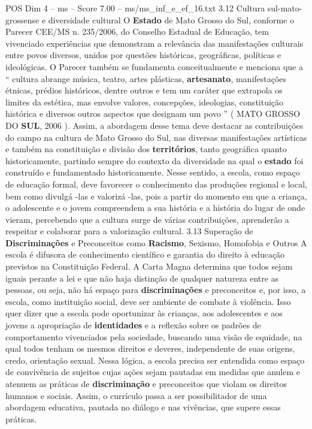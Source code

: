 \begin{textsample}{POS Dim 4 – ms – Score 7.00 – ms/ms\_inf\_e\_ef\_16.txt}  \label{ex:f4_pos_158}
3.12 Cultura sul-mato-grossense e diversidade cultural O \textbf{Estado} de Mato Grosso do Sul, conforme o Parecer CEE/MS n. 235/2006, do Conselho Estadual de Educação, tem vivenciado experiências que demonstram a relevância das manifestações culturais entre povos diversos, unidos por questões históricas, geográficas, políticas e ideológicas.
O Parecer também se fundamenta conceitualmente e menciona que a “ cultura abrange música, teatro, artes plásticas, \textbf{artesanato}, manifestações étnicas, prédios históricos, dentre outros e tem um caráter que extrapola os limites da estética, mas envolve valores, concepções, ideologias, constituição histórica e diversos outros aspectos que designam um povo ” ( MATO GROSSO DO \textbf{SUL}, 2006 ).
Assim, a abordagem desse tema deve destacar as contribuições do campo na cultura de Mato Grosso do Sul, nas diversas manifestações artísticas e também na constituição e divisão dos \textbf{territórios}, tanto geográfica quanto historicamente, partindo sempre do contexto da diversidade na qual o \textbf{estado} foi construído e fundamentado historicamente.
Nesse sentido, a escola, como espaço de educação formal, deve favorecer o conhecimento das produções regional e local, bem como divulgá -las e valorizá -las, pois a partir do momento em que a criança, o adolescente e o jovem compreendem a sua história e a história do lugar de onde vieram, percebendo que a cultura surge de várias contribuições, aprenderão a respeitar e colaborar para a valorização cultural. 3.13 Superação de \textbf{Discriminações} e Preconceitos como \textbf{Racismo}, Sexismo, Homofobia e Outros A escola é difusora de conhecimento científico e garantia do direito à educação previstos na Constituição Federal.
A Carta Magna determina que todos sejam iguais perante a lei e que não haja distinção de qualquer natureza entre as pessoas, ou seja, não há espaço para \textbf{discriminações} e preconceitos e, por isso, a escola, como instituição social, deve ser ambiente de combate à violência.
Isso quer dizer que a escola pode oportunizar às crianças, aos adolescentes e aos jovens a apropriação de \textbf{identidades} e a reflexão sobre os padrões de comportamento vivenciados pela sociedade, buscando uma visão de equidade, na qual todos tenham os mesmos direitos e deveres, independente de suas origens, credo, orientação sexual.
Nessa lógica, a escola precisa ser entendida como espaço de convivência de sujeitos cujas ações sejam pautadas em medidas que anulem e atenuem as práticas de \textbf{discriminação} e preconceitos que violam os direitos humanos e sociais.
Assim, o currículo passa a ser possibilitador de uma abordagem educativa, pautada no diálogo e nas vivências, que supere essas práticas.

\end{textsample}
